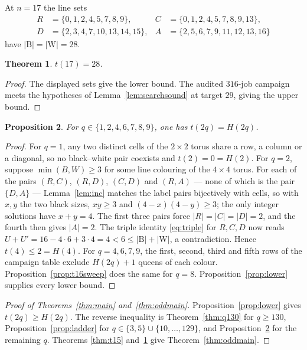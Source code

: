\documentclass[11pt]{amsart}
\newtheorem{theorem}{Theorem}
\newtheorem{proposition}[theorem]{Proposition}
\theoremstyle{definition}
\theoremstyle{remark}
\newcommand{\Bl}{\mathrm{B}}
\newcommand{\Wh}{\mathrm{W}}
\begin{document}
At $n=17$ the line sets
\[
\begin{aligned}
R&=\{0,1,2,4,5,7,8,9\},&
C&=\{0,1,2,4,5,7,8,9,13\},\\
D&=\{2,3,4,7,10,13,14,15\},&
A&=\{2,5,6,7,9,11,12,13,16\}
\end{aligned}
\]
have $|\Bl|=|\Wh|=28$.

\begin{theorem}\label{thm:t17}
$t(17)=28$.
\end{theorem}

\begin{proof}
The displayed sets give the lower bound.  The audited $316$-job campaign
meets the hypotheses of Lemma~\ref{lem:searchsound} at target $29$, giving
the upper bound.
\end{proof}

\begin{proposition}\label{prop:small-even}
For $q\in\{1,2,4,6,7,8,9\}$, one has $t(2q)=H(2q)$.
\end{proposition}

\begin{proof}
For $q=1$, any two distinct cells of the $2\times2$ torus share a row, a
column or a diagonal, so no black--white pair coexists and
$t(2)=0=H(2)$.  For $q=2$, suppose $\min(B,W)\ge3$ for some line colouring
of the $4\times4$ torus.  For each of the pairs $(R,C)$, $(R,D)$, $(C,D)$
and $(R,A)$ --- none of which is the pair $\{D,A\}$ --- Lemma~\ref{lem:inc}
matches the label pairs bijectively with cells, so with $x,y$ the two black
sizes, $xy\ge3$ and $(4-x)(4-y)\ge3$; the only integer solutions have
$x+y=4$.  The first three pairs force $|R|=|C|=|D|=2$, and the fourth then
gives $|A|=2$.  The triple identity \eqref{eq:triple} for $R,C,D$ now reads
$U+U'=16-4\cdot6+3\cdot4=4<6\le|\Bl|+|\Wh|$, a contradiction.  Hence
$t(4)\le2=H(4)$.  For $q=4,6,7,9$, the first,
second, third and fifth rows of the campaign table exclude
$H(2q)+1$ queens of each colour.  Proposition~\ref{prop:t16sweep} does the
same for $q=8$.  Proposition~\ref{prop:lower} supplies every lower bound.
\end{proof}

\begin{proof}[Proof of Theorems~\ref{thm:main} and~\ref{thm:oddmain}]
Proposition~\ref{prop:lower} gives $t(2q)\ge H(2q)$.  The reverse inequality
is Theorem~\ref{thm:q130} for $q\ge130$, Proposition~\ref{prop:ladder} for
$q\in\{3,5\}\cup\{10,\ldots,129\}$, and
Proposition~\ref{prop:small-even} for the remaining $q$.  Theorems
\ref{thm:t15} and~\ref{thm:t17} give Theorem~\ref{thm:oddmain}.
\end{proof}
\end{document}
